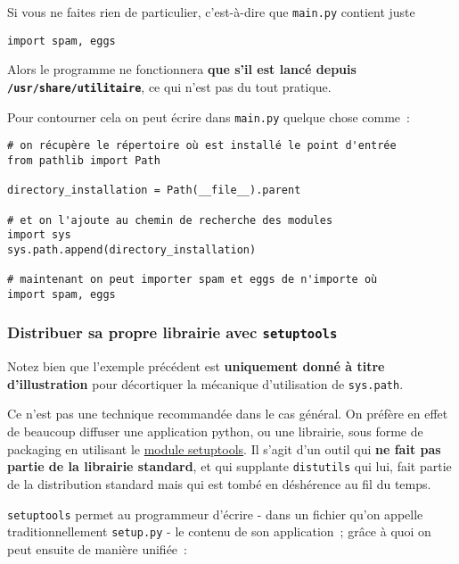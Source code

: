     Si vous ne faites rien de particulier, c'est-à-dire que \texttt{main.py}
contient juste

    \begin{verbatim}
import spam, eggs
\end{verbatim}

    Alors le programme ne fonctionnera \textbf{que s'il est lancé depuis
\texttt{/usr/share/utilitaire}}, ce qui n'est pas du tout pratique.

    Pour contourner cela on peut écrire dans \texttt{main.py} quelque chose
comme~:

    \begin{verbatim}
# on récupère le répertoire où est installé le point d'entrée
from pathlib import Path

directory_installation = Path(__file__).parent

# et on l'ajoute au chemin de recherche des modules
import sys
sys.path.append(directory_installation)

# maintenant on peut importer spam et eggs de n'importe où
import spam, eggs
\end{verbatim}

    \hypertarget{distribuer-sa-propre-librairie-avec-setuptools}{%
\subsubsection{\texorpdfstring{Distribuer sa propre librairie avec
\texttt{setuptools}}{Distribuer sa propre librairie avec setuptools}}\label{distribuer-sa-propre-librairie-avec-setuptools}}

    Notez bien que l'exemple précédent est \textbf{uniquement donné à titre
d'illustration} pour décortiquer la mécanique d'utilisation de
\texttt{sys.path}.

Ce n'est pas une technique recommandée dans le cas général. On préfère
en effet de beaucoup diffuser une application python, ou une librairie,
sous forme de packaging en utilisant le
\href{https://pypi.python.org/pypi/setuptools}{module setuptools}. Il
s'agit d'un outil qui \textbf{ne fait pas partie de la librairie
standard}, et qui supplante \texttt{distutils} qui lui, fait partie de
la distribution standard mais qui est tombé en déshérence au fil du
temps.

    \texttt{setuptools} permet au programmeur d'écrire - dans un fichier
qu'on appelle traditionnellement \texttt{setup.py} - le contenu de son
application~; grâce à quoi on peut ensuite de manière unifiée~:

